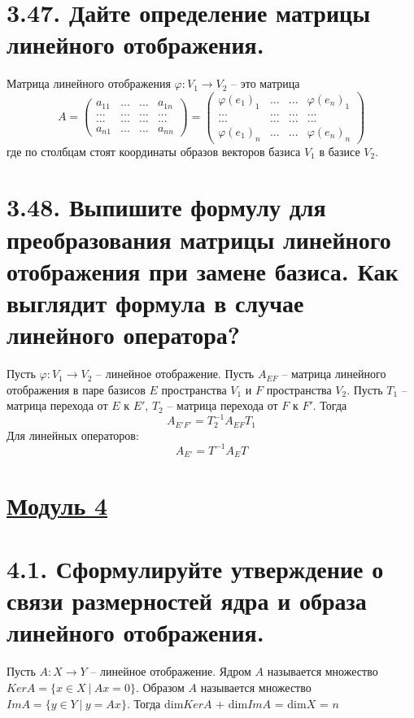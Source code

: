 \documentclass{article}
\begin{document}
\section*{\LARGE 3.47. Дайте определение матрицы линейного отображения.}
Матрица линейного отображения $\varphi : V_1 \rightarrow V_2$ -- это матрица 
$$
A = 
\begin{pmatrix}
a_{11} & ... & ... & a_{1n} \\
... & ... & ... & ... \\
... & ... & ... & ... \\
a_{n1} & ... & ... & a_{nn} 
\end{pmatrix}
=
\begin{pmatrix}
\varphi(e_1)_1 & ... & ... & \varphi(e_n)_1 \\
... & ... & ... & ... \\
... & ... & ... & ... \\
\varphi(e_1)_n & ... & ... & \varphi(e_n)_n 
\end{pmatrix}
$$
где по столбцам стоят координаты образов векторов базиса $V_1$ в базисе $V_2$.

\section*{\LARGE 3.48. Выпишите формулу для преобразования матрицы линейного отображения при замене базиса. Как выглядит формула в случае линейного оператора?}
Пусть $\varphi : V_1 \rightarrow V_2$ -- линейное отображение. Пусть $A_{EF}$ -- матрица линейного отображения в паре базисов $E$ пространства $V_1$ и $F$ пространства $V_2$. Пусть $T_1$ -- матрица перехода от $E$ к $E'$, $T_2$ --  матрица перехода от $F$ к $F'$. Тогда 
$$
A_{E'F'} = T_2^{-1}A_{EF}T_1
$$
Для линейных операторов:
$$
A_{E'} = T^{-1}A_ET
$$

\newpage
{}
\section*{\LARGE\centering \underline{Модуль 4}}

\section*{\LARGE 4.1. Сформулируйте утверждение о связи размерностей ядра и образа линейного отображения.}
Пусть $A : X \rightarrow Y$ -- линейное отображение.
\newline Ядром $A$ называется множество $KerA = \{x \in X \:|\: Ax = 0\}$. 
\newline Образом $A$ называется множество $ImA = \{y \in Y \:|\: y = Ax\}$.
\newline Тогда dim$KerA$ + dim$ImA$ = dim$X$ = $n$
\end{document}
